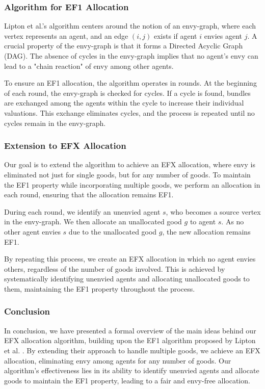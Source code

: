 \documentclass{article}
\begin{document}
\subsubsection{Algorithm for EF1 Allocation}

Lipton et al.'s algorithm \cite{10.1145/988772.988792} centers around the notion of an envy-graph, where each vertex represents an agent, and an edge $(i, j)$ exists if agent $i$ envies agent $j$. A crucial property of the envy-graph is that it forms a Directed Acyclic Graph (DAG). The absence of cycles in the envy-graph implies that no agent's envy can lead to a "chain reaction" of envy among other agents.

To ensure an EF1 allocation, the algorithm operates in rounds. At the beginning of each round, the envy-graph is checked for cycles. If a cycle is found, bundles are exchanged among the agents within the cycle to increase their individual valuations. This exchange eliminates cycles, and the process is repeated until no cycles remain in the envy-graph.

\subsubsection{Extension to EFX Allocation}

Our goal is to extend the algorithm to achieve an EFX allocation, where envy is eliminated not just for single goods, but for any number of goods. To maintain the EF1 property while incorporating multiple goods, we perform an allocation in each round, ensuring that the allocation remains EF1.

During each round, we identify an unenvied agent $s$, who becomes a source vertex in the envy-graph. We then allocate an unallocated good $g$ to agent $s$. As no other agent envies $s$ due to the unallocated good $g$, the new allocation remains EF1.

By repeating this process, we create an EFX allocation in which no agent envies others, regardless of the number of goods involved. This is achieved by systematically identifying unenvied agents and allocating unallocated goods to them, maintaining the EF1 property throughout the process.

\subsubsection{Conclusion}

In conclusion, we have presented a formal overview of the main ideas behind our EFX allocation algorithm, building upon the EF1 algorithm proposed by Lipton et al. \cite{10.1145/988772.988792}. By extending their approach to handle multiple goods, we achieve an EFX allocation, eliminating envy among agents for any number of goods. Our algorithm's effectiveness lies in its ability to identify unenvied agents and allocate goods to maintain the EF1 property, leading to a fair and envy-free allocation.
\end{document}
